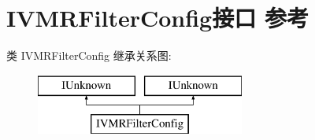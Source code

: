 \hypertarget{interface_i_v_m_r_filter_config}{}\section{I\+V\+M\+R\+Filter\+Config接口 参考}
\label{interface_i_v_m_r_filter_config}
类 I\+V\+M\+R\+Filter\+Config 继承关系图\+:\begin{figure}[H]
\begin{center}
\leavevmode
\includegraphics[height=2.000000cm]{interface_i_v_m_r_filter_config}
\end{center}
\end{figure}
